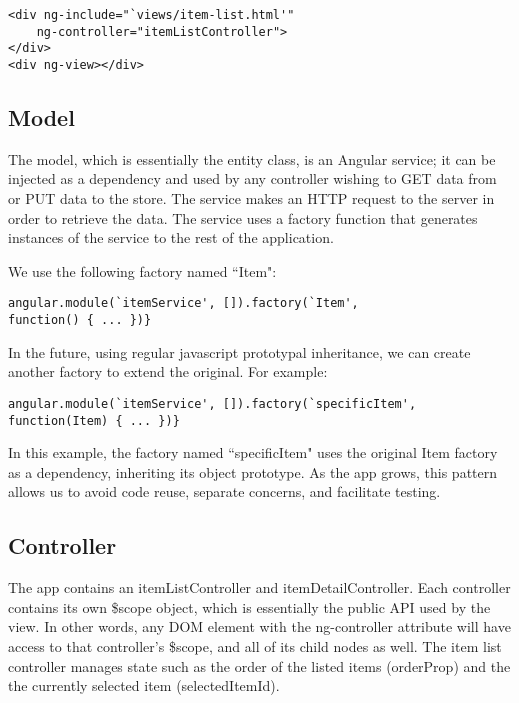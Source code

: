 \documentclass[letterpaper, 12pt]{article}
\begin{document}
\vspace{2mm}
\vspace{-3mm}\begin{verbatim}
<div ng-include="`views/item-list.html'"
    ng-controller="itemListController">
</div>
<div ng-view></div>
\end{verbatim}

\subsection{Model}
\noindent The model, which is essentially the entity class, is an Angular service; it can be injected as a dependency and used by any controller wishing to GET data from or PUT data to the store. The service makes an HTTP request to the server in order to retrieve the data. The service uses a factory function that generates instances of the service to the rest of the application.

\noindent We use the following factory named ``Item":

\vspace{2mm}
\vspace{-3mm}\begin{verbatim}
angular.module(`itemService', []).factory(`Item',
function() { ... })}
\end{verbatim}

\noindent In the future, using regular javascript prototypal inheritance, we can create another factory to extend the original. For example:

\vspace{-3mm}\begin{verbatim}
angular.module(`itemService', []).factory(`specificItem',
function(Item) { ... })}
\end{verbatim}


\noindent In this example, the factory named ``specificItem" uses the original Item factory as a dependency, inheriting its object prototype. As the app grows, this pattern allows us to avoid code reuse, separate concerns, and facilitate testing.

\subsection{Controller}
\noindent The app contains an itemListController and itemDetailController.  Each controller contains its own \$scope object, which is essentially the public API used by the view. In other words, any DOM element with the ng-controller attribute will have access to that controller's \$scope, and all of its child nodes as well. The item list controller manages state such as the order of the listed items (orderProp) and the the currently selected item (selectedItemId).
\end{document}
